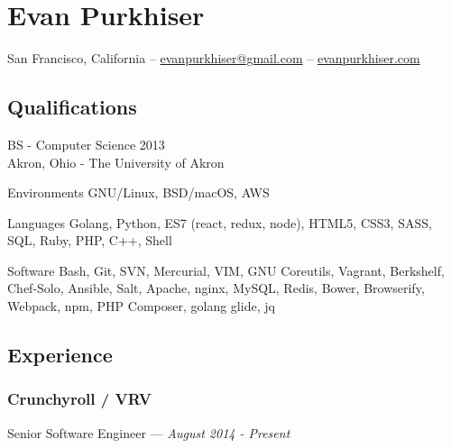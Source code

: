 \documentclass[letterpaper,10pt]{article}
\begin{document}
\section{Evan Purkhiser}

\hfill San Francisco, California --
\href{mailto:evanpurkhiser@gmail.com}{evanpurkhiser@gmail.com} --
\href{https://evanpurkhiser.com}{evanpurkhiser.com}

\subsection{Qualifications}

BS - Computer Science 2013\\
Akron, Ohio - The University of Akron

\begin{skills}
\item[Environments]
  GNU/Linux, BSD/macOS, AWS
\item[Languages]
  Golang, Python, ES7 (react, redux, node), HTML5, CSS3, SASS, SQL,
  Ruby, PHP, C++, Shell
\item[Software]
  Bash, Git, SVN, Mercurial, VIM, GNU Coreutils, Vagrant, Berkshelf,
  Chef-Solo, Ansible, Salt, Apache, nginx, MySQL, Redis, Bower, Browserify,
  Webpack, npm, PHP Composer, golang glide, jq
\end{skills}

\subsection{Experience}

\subsubsection{Crunchyroll / VRV}
\hfill Senior Software Engineer --- \emph{August 2014 - Present}
\end{document}
